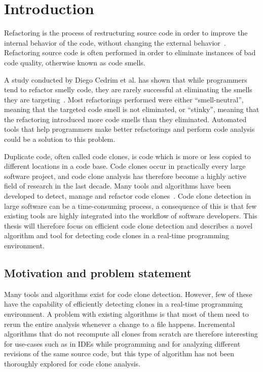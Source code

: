 \chapter{Introduction}

Refactoring is the process of restructuring source code in order to improve the internal
behavior of the code, without changing the external behavior~\cite[9]{fowlerrefactoring}.
Refactoring source code is often performed in order to eliminate instances of bad code
quality, otherwise known as code smells.

A study conducted by Diego Cedrim et al. has shown that while programmers tend to refactor
smelly code, they are rarely successful at eliminating the smells they are
targeting~\cite{Rohit_Gheyi_Impact}. Most refactorings performed were either
``smell-neutral'', meaning that the targeted code smell is not eliminated, or ``stinky'',
meaning that the refactoring introduced more code smells than they eliminated. Automated
tools that help programmers make better refactorings and perform code analysis could be a
solution to this problem. 

Duplicate code, often called code clones, is code which is more or less copied to
different locations in a code base. Code clones occur in practically every large software
project, and code clone analysis has therefore become a highly active field of research in
the last decade. Many tools and algorithms have been developed to detect, manage and
refactor code clones~\cite[6]{Inoue_introduction_to_cc}. Code clone detection in large
software can be a time-consuming process, a consequence of this is that few existing tools
are highly integrated into the workflow of software developers. This thesis will therefore
focus on efficient code clone detection and describes a novel algorithm and tool for
detecting code clones in a real-time programming environment.

\section{Motivation and problem statement}

Many tools and algorithms exist for code clone detection. However, few of these have the
capability of efficiently detecting clones in a real-time programming environment. A
problem with existing algorithms is that most of them need to rerun the entire analysis
whenever a change to a file happens. Incremental algorithms that do not recompute all
clones from scratch are therefore interesting for use-cases such as in IDEs while
programming and for analyzing different revisions of the same source code, but this type
of algorithm has not been thoroughly explored for code clone analysis.

